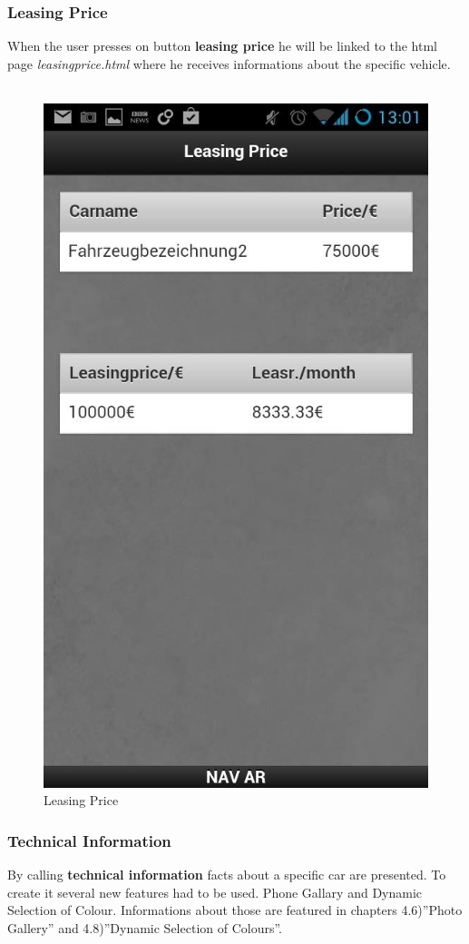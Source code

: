 \subsubsection{Leasing Price}
When the user presses on button \textbf{leasing price} he will be linked to the html page \textit{leasingprice.html} where he receives informations about the specific vehicle. \\
\
\

\begin{figure}[h]
\centering
\includegraphics[width=0.5\linewidth]{graphics/chapter4/5}
\caption{Leasing Price}
\end{figure}
\newpage


\subsubsection{Technical Information}
By calling \textbf{technical information} facts about a specific car are presented. To create it several new features had to be used. Phone Gallary and Dynamic Selection of Colour. Informations about those are featured in chapters 4.6)''Photo Gallery'' and  4.8)''Dynamic Selection of Colours''.
\\


